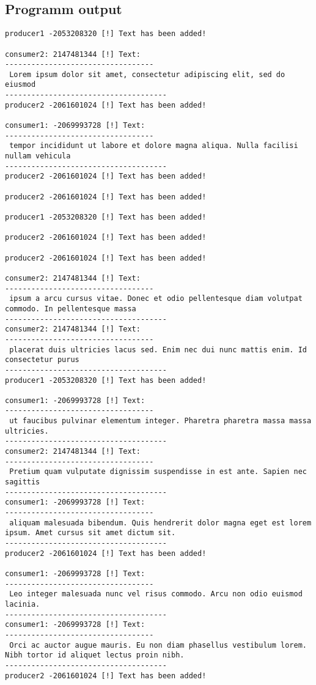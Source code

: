 \documentclass{article}
\begin{document}
\subsection{Programm output}
\normalsize
\begin{verbatim}
producer1 -2053208320 [!] Text has been added! 

consumer2: 2147481344 [!] Text: 
----------------------------------
 Lorem ipsum dolor sit amet, consectetur adipiscing elit, sed do eiusmod 
-------------------------------------
producer2 -2061601024 [!] Text has been added! 

consumer1: -2069993728 [!] Text: 
----------------------------------
 tempor incididunt ut labore et dolore magna aliqua. Nulla facilisi nullam vehicula 
-------------------------------------
producer2 -2061601024 [!] Text has been added! 

producer2 -2061601024 [!] Text has been added! 

producer1 -2053208320 [!] Text has been added! 

producer2 -2061601024 [!] Text has been added! 

producer2 -2061601024 [!] Text has been added! 

consumer2: 2147481344 [!] Text: 
----------------------------------
 ipsum a arcu cursus vitae. Donec et odio pellentesque diam volutpat commodo. In pellentesque massa
-------------------------------------
consumer2: 2147481344 [!] Text: 
----------------------------------
 placerat duis ultricies lacus sed. Enim nec dui nunc mattis enim. Id consectetur purus
-------------------------------------
producer1 -2053208320 [!] Text has been added! 

consumer1: -2069993728 [!] Text: 
----------------------------------
 ut faucibus pulvinar elementum integer. Pharetra pharetra massa massa ultricies.
-------------------------------------
consumer2: 2147481344 [!] Text: 
----------------------------------
 Pretium quam vulputate dignissim suspendisse in est ante. Sapien nec sagittis
-------------------------------------
consumer1: -2069993728 [!] Text: 
----------------------------------
 aliquam malesuada bibendum. Quis hendrerit dolor magna eget est lorem ipsum. Amet cursus sit amet dictum sit.
-------------------------------------
producer2 -2061601024 [!] Text has been added! 

consumer1: -2069993728 [!] Text: 
----------------------------------
 Leo integer malesuada nunc vel risus commodo. Arcu non odio euismod lacinia. 
-------------------------------------
consumer1: -2069993728 [!] Text: 
----------------------------------
 Orci ac auctor augue mauris. Eu non diam phasellus vestibulum lorem. Nibh tortor id aliquet lectus proin nibh.
-------------------------------------
producer2 -2061601024 [!] Text has been added! 


\end{verbatim}
\end{document}
